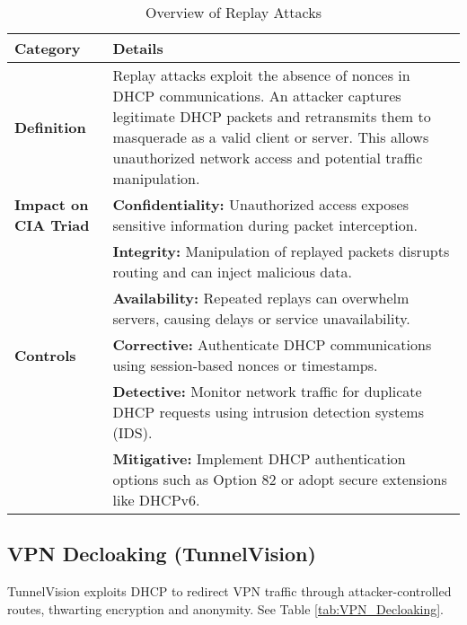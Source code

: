 \documentclass[conference]{IEEEtran}
\begin{document}
        \begin{table*}[h!]
            \centering
            \caption{Overview of Replay Attacks}
            \label{tab:Replay_Attacks}
            \begin{tabular}{@{}>{\raggedright}p{3cm} p{10cm}@{}}
                \toprule
                \textbf{Category} & \textbf{Details} \\ 
                \midrule
                \textbf{Definition} & Replay attacks exploit the absence of nonces in DHCP communications. An attacker captures legitimate DHCP packets and retransmits them to masquerade as a valid client or server. This allows unauthorized network access and potential traffic manipulation. \\ 
                \midrule
                \textbf{Impact on CIA Triad} & 
                \textbf{Confidentiality:} Unauthorized access exposes sensitive information during packet interception. \\
                & \textbf{Integrity:} Manipulation of replayed packets disrupts routing and can inject malicious data. \\
                & \textbf{Availability:} Repeated replays can overwhelm servers, causing delays or service unavailability. \\ 
                \midrule
                \textbf{Controls} & 
                \textbf{Corrective:} Authenticate DHCP communications using session-based nonces or timestamps. \\
                & \textbf{Detective:} Monitor network traffic for duplicate DHCP requests using intrusion detection systems (IDS). \\
                & \textbf{Mitigative:} Implement DHCP authentication options such as Option 82 or adopt secure extensions like DHCPv6. \\ 
                \bottomrule
            \end{tabular}
        \end{table*}

    \subsection{VPN Decloaking (TunnelVision)}
    \label{subsec:VPN_Decloaking}

        TunnelVision exploits DHCP to redirect VPN traffic through attacker-controlled routes, thwarting encryption and anonymity. See Table \ref{tab:VPN_Decloaking}.
\end{document}
